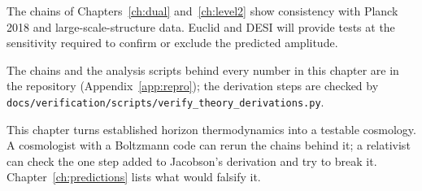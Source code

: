 The chains of Chapters~\ref{ch:dual} and~\ref{ch:level2} show consistency with Planck 2018 and large-scale-structure data. Euclid and DESI will provide
tests at the sensitivity required to confirm or exclude the predicted amplitude. \prediction

The chains and the analysis scripts behind every number in this chapter are in the repository (Appendix~\ref{app:repro}); the derivation steps are
checked by \texttt{docs/verification/scripts/\allowbreak{}verify\_theory\_derivations.py}.

This chapter turns established horizon thermodynamics into a testable cosmology. A cosmologist with a Boltzmann code can rerun the chains behind it; a relativist can check the one step added to Jacobson's derivation and try to break it. Chapter~\ref{ch:predictions} lists what would falsify it.
